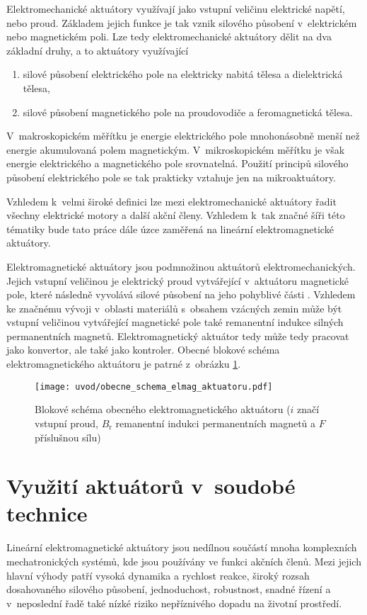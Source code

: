 Elektromechanické aktuátory využívají jako vstupní veličinu elektrické napětí, nebo proud. Základem jejich funkce je tak vznik silového působení v~elektrickém nebo magnetickém poli. Lze tedy elektromechanické aktuátory dělit na dva základní druhy, a to aktuátory využívající
\begin{enumerate}[a]
    \item silové působení elektrického pole na elektricky nabitá tělesa a dielektrická tělesa,
    \item silové působení magnetického pole na proudovodiče a feromagnetická tělesa.
\end{enumerate}

V~makroskopickém měřítku je energie elektrického pole mnohonásobně menší než energie akumulovaná polem magnetickým. V~mikroskopickém měřítku je však energie elektrického a magnetického pole srovnatelná. Použití principů silového působení elektrického pole se tak prakticky vztahuje jen na mikroaktuátory. \cite{husak2008mikrosenzory}

Vzhledem k~velmi široké definici lze mezi elektromechanické aktuátory řadit všechny elektrické motory a další akční členy. Vzhledem k~tak značné šíři této tématiky bude tato práce dále úzce zaměřená na lineární elektromagnetické aktuátory.

Elektromagnetické aktuátory jsou podmnožinou aktuátorů elektromechanických. Jejich vstupní veličinou je elektrický proud vytvářející v~aktuátoru magnetické pole, které následně vyvolává silové působení na jeho pohyblivé části \cite{boldea2005linear}. Vzhledem ke značnému vývoji v~oblasti materiálů s~obsahem vzácných zemin může být vstupní veličinou vytvářející magnetické pole také remanentní indukce silných permanentních magnetů. Elektromagnetický aktuátor tedy může tedy pracovat jako konvertor, ale také jako kontroler. Obecné blokové schéma elektromagnetického aktuátoru je patrné z~obrázku \ref{obr:obecne_schema_elmag_aktuatoru}. \cite{mach2010aktuatory}

\begin{figure}[h!]
  \centering
  \texttt{[image: uvod/obecne\_schema\_elmag\_aktuatoru.pdf]}
  \caption{Blokové schéma obecného elektromagnetického aktuátoru ($i$ značí vstupní proud, $B_\mathrm{r}$ remanentní indukci permanentních magnetů a $F$ příslušnou sílu)}
  \label{obr:obecne_schema_elmag_aktuatoru}
\end{figure}

\section{Využití aktuátorů v~soudobé technice}
Lineární elektromagnetické aktuátory jsou nedílnou součástí mnoha komplexních mechatronických systémů, kde jsou používány ve funkci akčních členů. Mezi jejich hlavní výhody patří vysoká dynamika a rychlost reakce, široký rozsah dosahovaného silového působení, jednoduchost, robustnost, snadné řízení a v~neposlední řadě také nízké riziko nepříznivého dopadu na životní prostředí. \cite{gomis2010design}

